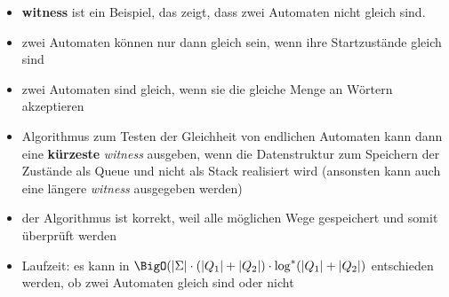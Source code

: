 \begin{itemize}
	\item \textbf{witness} ist ein Beispiel, das zeigt, dass zwei Automaten nicht gleich sind.
	\item zwei Automaten können nur dann gleich sein, wenn ihre Startzustände gleich sind
	\item zwei Automaten sind gleich, wenn sie die gleiche Menge an Wörtern akzeptieren
	\item Algorithmus zum Testen der Gleichheit von endlichen Automaten kann dann eine \textbf{kürzeste} \emph{witness} ausgeben, wenn die Datenstruktur zum Speichern der Zustände als Queue und nicht als Stack realisiert wird (ansonsten kann auch eine längere \textit{witness} ausgegeben werden)
	\item der Algorithmus ist korrekt, weil alle möglichen Wege gespeichert und somit überprüft werden
	\item Laufzeit: es kann in $\BigO(|\Sigma|\cdot (|Q_1|+|Q_2|)\cdot \log^{*}(|Q_1|+|Q_2|)$ entschieden werden, ob zwei Automaten gleich sind oder nicht
\end{itemize}
